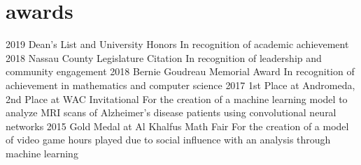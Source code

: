 \documentclass[]{friggeri-cv}
\begin{document}
\section{awards}
\begin{entrylist}
    \entry
    {2019}
    {Dean's List and University Honors}
    {}
    {In recognition of academic achievement}
    \entry
    {2018}
    {Nassau County Legislature Citation}
    {}
    {In recognition of leadership and community engagement} 
    \entry
    {2018}
    {Bernie Goudreau Memorial Award}
    {}
    {In recognition of achievement in mathematics and computer science}
    \entry
    {2017}
    {1st Place at Andromeda, 2nd Place at WAC Invitational}
    {}
    {For the creation of a machine learning model to analyze MRI scans of Alzheimer’s disease patients using convolutional neural networks}
    \entry
    {2015}
    {Gold Medal at Al Khalfus Math Fair}
    {}
    {For the creation of a
    model of video game hours played due to social influence with an analysis through machine learning}
\end{entrylist}
\end{document}
